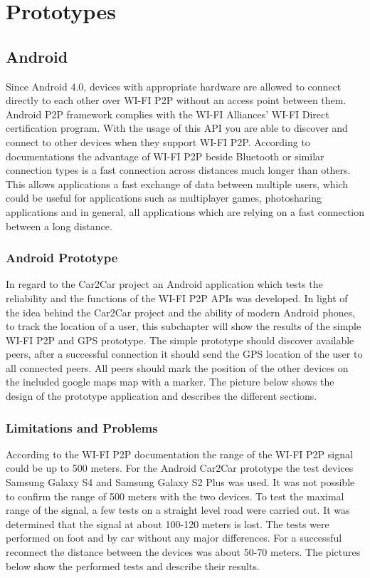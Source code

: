 \chapter{Prototypes}
\label{cha:Prototypes}
\section{Android}
Since Android 4.0, devices with appropriate hardware are allowed to connect directly to each other over WI-FI P2P without an access point between them. Android P2P framework complies with the WI-FI Alliances' WI-FI Direct certification program. With the usage of this API you are able to discover and connect to other devices when they support WI-FI P2P.  According to documentations the advantage of WI-FI P2P beside Bluetooth or similar connection types is a fast connection across distances much longer than others. This allows applications a fast exchange of data between multiple users, which could be useful for applications such as multiplayer games, photosharing applications and in general, all applications which are relying on a fast connection between a long distance.

\subsection*{Android Prototype}
\label{subsec:AndroidPrototype}
In regard to the Car2Car project an Android application which tests the reliability and the functions of the WI-FI P2P APIs was developed. In light of the idea behind the Car2Car project and the ability of modern Android phones, to track the location of a user, this subchapter will show the results of the simple WI-FI P2P and GPS prototype.
The simple prototype should discover available peers, after a successful connection it should send the GPS location of the user to all connected peers. All peers should mark the position of the other devices on the included google maps map with a marker. The picture below shows the design of the prototype application and describes the different sections.

\subsection*{Limitations and Problems}
\label{subsec:LimitationsProblems}
According to the WI-FI P2P documentation the range of the WI-FI P2P signal could be up to 500 meters. For the Android Car2Car prototype the test devices Samsung Galaxy S4 and Samsung Galaxy S2 Plus was used. It was not possible to confirm the range of 500 meters with the two devices. To test the maximal range of the signal, a few tests on a straight level road were carried out. It was determined that the signal at about 100-120 meters is lost. The tests were performed on foot and by car without any major differences. For a successful reconnect the distance between the devices was about 50-70 meters. The pictures below show the performed tests and describe their results.

